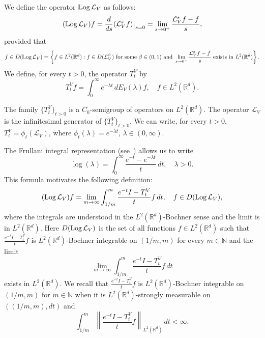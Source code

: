 \documentclass[10pt, a4paper, reqno]{amsart}
\theoremstyle{definition}
\theoremstyle{remark}
\DeclareMathOperator{\LLog}{\mathbb{L}\textup{og}}
\DeclareMathOperator{\Log}{\textup{Log}}
\numberwithin{equation}{section}
\begin{document}
   We define the operator $\LLog \mathcal{L}_V$ as follows:
\begin{equation*}
    (\LLog \mathcal{L}_V) f = \frac{d}{ds}(\mathcal{L}_V^s f)\big|_{s=0} = \lim_{s\rightarrow 0^+} \frac{\mathcal{L}_V^s f - f}{s},
\end{equation*}
provided that 
\begin{equation*}
    f \in D(\LLog \mathcal{L}_V) = \left\{ f \in L^2(\mathbb{R}^d) : f \in D(\mathcal{L}_V^\beta) \text{ for some } \beta \in (0,1) \text{ and } \lim_{s\rightarrow 0^+} \frac{\mathcal{L}_V^s f - f}{s} \text{ exists in } L^2(\mathbb{R}^d) \right\}.
\end{equation*}
We define, for every $t > 0$, the operator $T_t^V$ by 
\begin{equation*}
    T_t^V f = \int_0^\infty e^{-\lambda t} \, dE_V(\lambda) f, \quad f \in L^2(\mathbb{R}^d).
\end{equation*}

The family $\{T_t^V\}_{t>0}$ is a $C_0$-semigroup of operators on $L^2(\mathbb{R}^d)$. The operator $\mathcal{L}_V$ is the infinitesimal generator of $\{T_t^V\}_{t>0}$. We can write, for every $t > 0$, $T_t^V = \phi_t(\mathcal{L}_V)$, where $\phi_t(\lambda) = e^{-\lambda t}$, $\lambda \in (0,\infty)$.

The Frullani integral representation (see~\cite[p. 363]{GR}) allows us to write
\begin{equation*}
    \log(\lambda) = \int_0^\infty \frac{e^{-t} - e^{-\lambda t}}{t} \, dt, \quad \lambda > 0. 
\end{equation*}
This formula motivates the following definition:
\begin{equation*}
    (\Log \mathcal{L}_V) f = \lim_{m \rightarrow \infty} \int_{1/m}^m \frac{e^{-t}I - T_t^V}{t} f \, dt, \quad f \in D(\Log \mathcal{L}_V),
\end{equation*}
where the integrals are understood in the $L^2(\mathbb{R}^d)$-Bochner sense and the limit is in $L^2(\mathbb{R}^d)$. Here
$D(\Log \mathcal{L}_V)$ is the set of all functions $f \in L^2(\mathbb{R}^d)$ such that $\displaystyle \frac{e^{-t} I - T_t^V}{t} f$ is $L^2(\mathbb{R}^d)$-Bochner integrable on $(1/m,m)$ for every $m \in \mathbb{N}$ and the limit
\begin{equation*}
    \lim_{m \rightarrow \infty} \int_{1/m}^m \frac{e^{-t} I - T_t^V}{t} f \, dt
\end{equation*}
exists in $L^2(\mathbb{R}^d)$. We recall that $\displaystyle \frac{e^{-t} I - T_t^V}{t} f$ is $L^2(\mathbb{R}^d)$-Bochner integrable on $(1/m,m)$ for $m \in \mathbb{N}$ when it is $L^2(\mathbb{R}^d)$-strongly measurable on $((1/m,m), dt)$ and 
\begin{equation*}
    \int_{1/m}^m \left\| \frac{e^{-t} I - T_t^V}{t} f \right\|_{L^2(\mathbb{R}^d)} \, dt < \infty.
\end{equation*}
\end{document}
